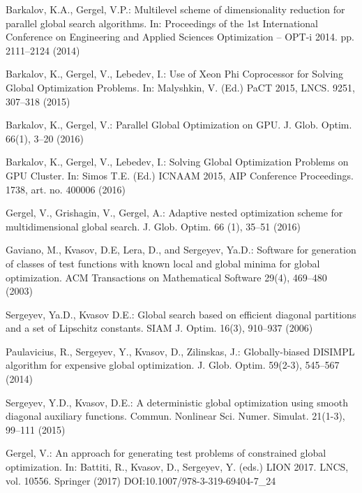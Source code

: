 \documentclass{llncs}
\begin{document}
\begin{thebibliography}{99}
Barkalov, K.A., Gergel, V.P.: Multilevel scheme of dimensionality reduction for parallel global search algorithms. In: Proceedings of the 1st International Conference on Engineering and Applied Sciences Optimization -- OPT-i 2014. pp. 2111--2124 (2014)

Barkalov, K., Gergel, V., Lebedev, I.: Use of Xeon Phi Coprocessor for Solving Global Optimization Problems. In: Malyshkin, V. (Ed.) PaCT 2015, LNCS. 9251, 307--318 (2015)

Barkalov, K., Gergel, V.: Parallel Global Optimization on GPU. J. Glob. Optim. 66(1), 3--20 (2016)

Barkalov, K., Gergel, V., Lebedev, I.: Solving Global Optimization Problems on GPU Cluster. In: Simos T.E. (Ed.) ICNAAM 2015, AIP Conference Proceedings. 1738, art. no. 400006 (2016)

Gergel, V., Grishagin, V., Gergel, A.: Adaptive nested optimization scheme for multidimensional global search. J. Glob. Optim. 66 (1), 35--51 (2016)

Gaviano, M., Kvasov, D.E, Lera, D., and Sergeyev, Ya.D.: Software for generation of classes of test functions with known local and global minima for global optimization. ACM Transactions on Mathematical Software 29(4), 469--480 (2003)

Sergeyev, Ya.D., Kvasov D.E.: Global search based on efficient diagonal partitions and a set of Lipschitz constants. SIAM J. Optim. 16(3), 910--937 (2006)

Paulavicius, R., Sergeyev, Y., Kvasov, D., Zilinskas, J.: Globally-biased DISIMPL algorithm for expensive global optimization. J. Glob. Optim. 59(2-3), 545--567 (2014)

Sergeyev, Y.D., Kvasov, D.E.: A deterministic global optimization using smooth diagonal auxiliary functions. Commun. Nonlinear Sci. Numer. Simulat. 21(1-3), 99--111 (2015)

Gergel, V.: An approach for generating test problems of constrained global optimization. In: Battiti, R., Kvasov, D., Sergeyev, Y. (eds.) LION 2017. LNCS, vol. 10556. Springer (2017) DOI:10.1007/978-3-319-69404-7\_24

                                                                           
\end{thebibliography}
\end{document}
